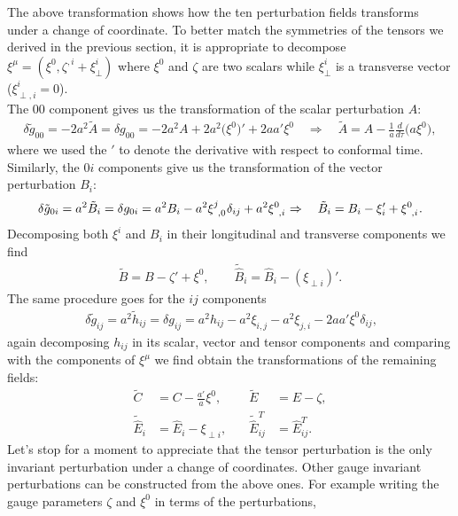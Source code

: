 The above transformation shows how the ten perturbation fields transforms under a change of coordinate. To better match the symmetries of the tensors we derived in the previous section, it is appropriate to decompose $\xi^\mu=(\xi^0,\zeta^{,i}+\xi^i_{\perp})$ where $\xi^0$ and $\zeta$ are two scalars while $\xi_\perp^i$ is a transverse vector ($\xi^i_{\perp,i}=0$).\\ The $00$ component gives us the transformation of the scalar perturbation $A$:
\begin{align}
    \delta \tilde g_{00}=-2a^2\tilde A=\delta g_{00}=- 2a^2 A+2a^2\big(\xi^{0}\big)'+2aa'\xi^0\quad \Rightarrow\quad{\tilde A=A-\frac{1}{a}\frac{d}{d\tau}\big(a\xi^0\big)},\label{eq:gauge_A}
\end{align}
where we used the $'$ to denote the derivative with respect to conformal time.\\
Similarly, the $0i$ components give us the transformation of the vector perturbation $B_i$:
\begin{align*}
    \delta \tilde g_{0i}=a^2\tilde B_i=\delta g_{0i}=a^2B_i-a^2\tensor{\xi}{^j_{,0}}\delta_{ij}+a^2\tensor{\xi}{^0_{,i}} \Rightarrow\quad \tilde B_i=B_i-\xi_{i}'+\tensor{\xi}{^0_{,i}}.
\end{align*}
Decomposing both $\xi^i$ and $B_i$ in their longitudinal and transverse components we find
\begin{align}\label{eq:gauge_B}
    \tilde B=B-\zeta'+\xi^0,\qquad
    \tilde{\hat B}_i=\hat B_i-(\xi_{\perp i})'.
\end{align}
The same procedure goes for the $ij$ components
\begin{align*}\
    \delta \tilde g_{ij}=a^2\tilde h_{ij}=\delta g_{ij}=a^2h_{ij}-a^2\xi_{i,j}-a^2\xi_{j,i}-2aa'\xi^0\delta_{ij},
\end{align*}
again decomposing $h_{ij}$ in its scalar, vector and tensor components and comparing with the components of $\xi^\mu$ we find obtain the transformations of the remaining fields:
\begin{align}
    \tilde C&=C-\frac{a'}{a}\xi^0,&\quad
    \tilde E&=E-\zeta,\label{eq:gauge_CE}\\
    \tilde{\hat E}_i&=\hat E_i-\xi_{\perp i },&\quad
    \tilde{\hat E}^T_{ij}&=\hat E^T_{ij}.\label{eq:gauge_h}
\end{align} 
Let's stop for a moment to appreciate that the tensor perturbation is the only invariant perturbation under a change of coordinates. Other gauge invariant perturbations can be constructed from the above ones. For example writing the gauge parameters $\zeta$ and $\xi^0$ in terms of the perturbations,
